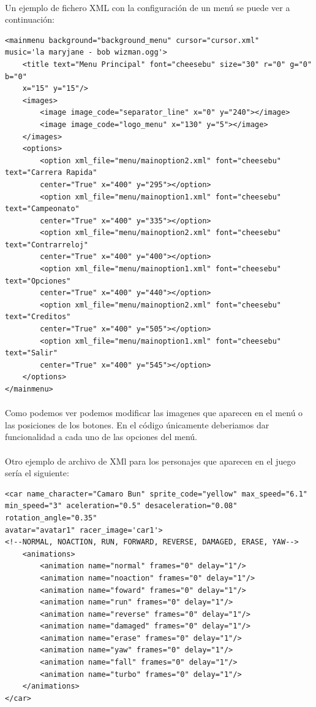\paragraph{}
Un ejemplo de fichero XML con la configuración de un menú se puede ver a continuación:

\begin{lstlisting}[style=XML]
<mainmenu background="background_menu" cursor="cursor.xml" 
music='la maryjane - bob wizman.ogg'>
    <title text="Menu Principal" font="cheesebu" size="30" r="0" g="0" b="0" 
    x="15" y="15"/>
    <images>
        <image image_code="separator_line" x="0" y="240"></image>
        <image image_code="logo_menu" x="130" y="5"></image>
    </images>
    <options>
        <option xml_file="menu/mainoption2.xml" font="cheesebu" text="Carrera Rapida" 
        center="True" x="400" y="295"></option>
        <option xml_file="menu/mainoption1.xml" font="cheesebu" text="Campeonato" 
        center="True" x="400" y="335"></option>
        <option xml_file="menu/mainoption2.xml" font="cheesebu" text="Contrarreloj" 
        center="True" x="400" y="400"></option>
        <option xml_file="menu/mainoption1.xml" font="cheesebu" text="Opciones" 
        center="True" x="400" y="440"></option>
        <option xml_file="menu/mainoption2.xml" font="cheesebu" text="Creditos" 
        center="True" x="400" y="505"></option>
        <option xml_file="menu/mainoption1.xml" font="cheesebu" text="Salir" 
        center="True" x="400" y="545"></option>
    </options>
</mainmenu>
\end{lstlisting}

\paragraph{}
Como podemos ver podemos modificar las imagenes que aparecen en el menú o las posiciones de los botones.
En el código únicamente deberiamos dar funcionalidad a cada uno de las opciones del menú.

\paragraph{}
Otro ejemplo de archivo de XMl para los personajes que aparecen en el juego sería el siguiente:

\begin{lstlisting}[style=XML]
<car name_character="Camaro Bun" sprite_code="yellow" max_speed="6.1" 
min_speed="3" aceleration="0.5" desaceleration="0.08" rotation_angle="0.35" 
avatar="avatar1" racer_image='car1'>
<!--NORMAL, NOACTION, RUN, FORWARD, REVERSE, DAMAGED, ERASE, YAW-->
    <animations>
        <animation name="normal" frames="0" delay="1"/>
        <animation name="noaction" frames="0" delay="1"/>
        <animation name="foward" frames="0" delay="1"/>
        <animation name="run" frames="0" delay="1"/>
        <animation name="reverse" frames="0" delay="1"/>
        <animation name="damaged" frames="0" delay="1"/>
        <animation name="erase" frames="0" delay="1"/>
        <animation name="yaw" frames="0" delay="1"/>
        <animation name="fall" frames="0" delay="1"/>
        <animation name="turbo" frames="0" delay="1"/>
    </animations>
</car>
\end{lstlisting}

